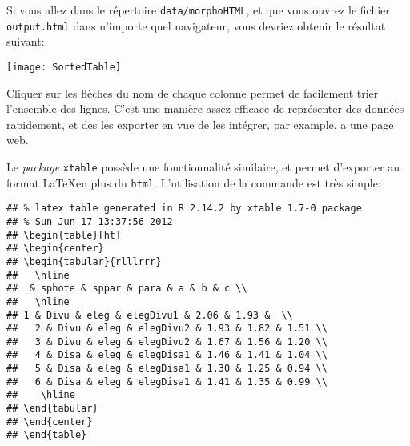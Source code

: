 Si vous allez dans le répertoire \texttt{data/morphoHTML}, et que vous ouvrez le fichier \texttt{output.html} dans n'importe quel navigateur, vous devriez obtenir le résultat suivant:

\begin{center}
\texttt{[image: SortedTable]}
\end{center}

Cliquer sur les flèches du nom de chaque colonne permet de facilement trier l'ensemble des lignes. C'est une manière assez efficace de représenter des données rapidement, et des les exporter en vue de les intégrer, par example, a une page web.

Le \emph{package} \texttt{xtable} possède une fonctionnalité similaire, et permet d'exporter au format \LaTeX en plus du \texttt{html}. L'utilisation de la commande est très simple:

\begin{knitrout}
\color{fgcolor}\begin{kframe}
\begin{flushleft}
\ttfamily\noindent
{}\hlkeyword{(}\hlkeyword{(}\hlkeyword{[}\hlkeyword{,}{\ }\hlkeyword{(}\hlkeyword{:}\hlkeyword{)}\hlkeyword{]}\hlkeyword{)}\hlkeyword{)}\mbox{}
\normalfont
\end{flushleft}
\begin{verbatim}
## % latex table generated in R 2.14.2 by xtable 1.7-0 package
## % Sun Jun 17 13:37:56 2012
## \begin{table}[ht]
## \begin{center}
## \begin{tabular}{rlllrrr}
##   \hline
##  & sphote & sppar & para & a & b & c \\ 
##   \hline
## 1 & Divu & eleg & elegDivu1 & 2.06 & 1.93 &  \\ 
##   2 & Divu & eleg & elegDivu2 & 1.93 & 1.82 & 1.51 \\ 
##   3 & Divu & eleg & elegDivu2 & 1.67 & 1.56 & 1.20 \\ 
##   4 & Disa & eleg & elegDisa1 & 1.46 & 1.41 & 1.04 \\ 
##   5 & Disa & eleg & elegDisa1 & 1.30 & 1.25 & 0.94 \\ 
##   6 & Disa & eleg & elegDisa1 & 1.41 & 1.35 & 0.99 \\ 
##    \hline
## \end{tabular}
## \end{center}
## \end{table}
\end{verbatim}
\end{kframe}
\end{knitrout}


